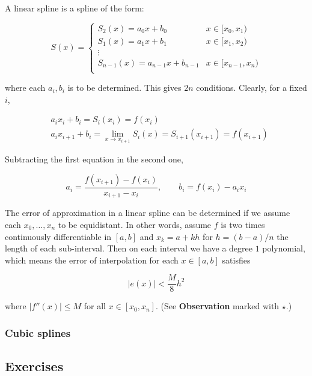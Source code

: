 \documentclass[12pt]{article}
\theoremstyle{definition}
\begin{document}
A linear spline is a spline of the form:

\begin{equation*}
    S(x) = \begin{cases}
        S_2(x) = a_0x + b_0 & x \in [x_0, x_1)\\
        S_1(x) = a_1x + b_1 & x \in [x_1, x_2)\\
        \vdots \\
        S_{n-1}(x) = a_{n-1}x + b_{n-1} & x \in [x_{n-1}, x_n)\\
    \end{cases}
\end{equation*}

where each $a_i, b_i$ is to be determined. This gives $2n$ conditions. Clearly,
for a fixed $i$,

\begin{align*}
    &a_i x_i + b_i = S_i(x_i) = f(x_i) \\ 
    &a_i x_{i+1} + b_i = \lim_{x \to x_{i+1}} S_i(x) = S_{i+1}(x_{i+1}) =
    f(x_{i+1})
\end{align*}

Subtracting the first equation in the second one,

\begin{equation*}
    a_i = \frac{f(x_{i+1}) - f(x_i)}{x_{i+1} - x_i}, \qquad b_i = f(x_i) -
    a_ix_i
\end{equation*}

The error of approximation in a linear spline can be determined if we assume
each $x_0, \ldots, x_n$ to be equidistant. In other words, assume $f$ is two
times continuously differentiable in $[a, b]$ and $x_k = a + kh$ for $h = (b-a)
/ n$ the length of each sub-interval. Then on each interval we have a degree $1$
polynomial, which means the error of interpolation for each $x \in [a, b]$
satisfies 

\begin{equation*}
    \left| e(x) \right|  < \frac{M}{8}h^2
\end{equation*}

where $\left| f''(x) \right| \leq M$ for all $x \in [x_0, x_n]$. (See
\textbf{Observation} marked with $\star$.)

\subsubsection{Cubic splines}

\pagebreak 

\subsection{Exercises}
\end{document}
